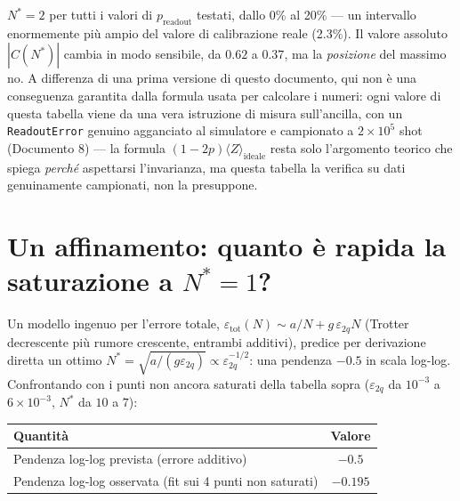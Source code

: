 \documentclass[11pt,a4paper]{article}
\begin{document}
$N^*=2$ per tutti i valori di $p_\text{readout}$ testati, dallo 0\% al 20\% ---
un intervallo enormemente più ampio del valore di calibrazione reale (2.3\%).
Il valore assoluto $|C(N^*)|$ cambia in modo sensibile, da $0.62$ a $0.37$, ma
la \emph{posizione} del massimo no. A differenza di una prima versione di
questo documento, qui non è una conseguenza garantita dalla formula usata
per calcolare i numeri: ogni valore di questa tabella viene da una vera
istruzione di misura sull'ancilla, con un \texttt{ReadoutError} genuino
agganciato al simulatore e campionato a $2\times10^5$ shot (Documento 8) ---
la formula $(1-2p)\langle Z\rangle_\text{ideale}$ resta solo l'argomento
teorico che spiega \emph{perché} aspettarsi l'invarianza, ma questa tabella
la verifica su dati genuinamente campionati, non la presuppone.


\section{Un affinamento: quanto è rapida la saturazione a $N^*=1$?}

Un modello ingenuo per l'errore totale, $\varepsilon_\text{tot}(N)\sim
a/N+g\,\varepsilon_{2q}N$ (Trotter decrescente più rumore crescente, entrambi
additivi), predice per derivazione diretta un ottimo
$N^*=\sqrt{a/(g\varepsilon_{2q})}\propto\varepsilon_{2q}^{-1/2}$: una pendenza
$-0.5$ in scala log-log. Confrontando con i punti non ancora saturati della
tabella sopra ($\varepsilon_{2q}$ da $10^{-3}$ a $6\times10^{-3}$, $N^*$ da
$10$ a $7$):

\begin{center}
\renewcommand{\arraystretch}{1.2}
\begin{tabular}{@{}lc@{}}
\toprule
Quantità & Valore\\
\midrule
Pendenza log-log prevista (errore additivo) & $-0.5$\\
Pendenza log-log osservata (fit sui 4 punti non saturati) & $-0.195$\\
\bottomrule
\end{tabular}
\end{center}
\end{document}
